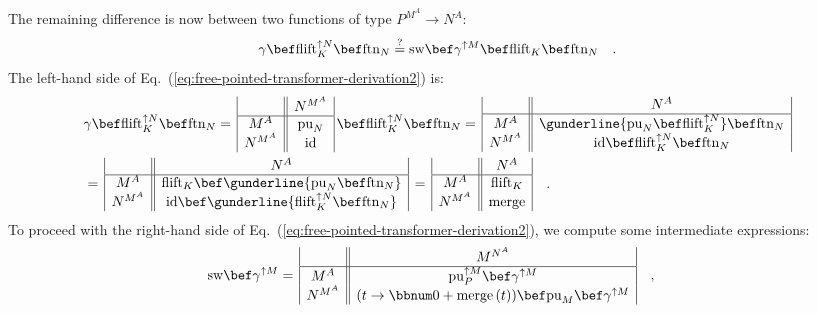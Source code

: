 The remaining difference is now between two functions of type $P^{M^{A}}\rightarrow N^{A}$:
\begin{equation}
\gamma\bef\text{flift}_{K}^{\uparrow N}\bef\text{ftn}_{N}\overset{?}{=}\text{sw}\bef\gamma^{\uparrow M}\bef\text{flift}_{K}\bef\text{ftn}_{N}\quad.\label{eq:free-pointed-transformer-derivation2}
\end{equation}
The left-hand side of Eq.~(\ref{eq:free-pointed-transformer-derivation2})
is:
\begin{align*}
 & \gamma\bef\text{flift}_{K}^{\uparrow N}\bef\text{ftn}_{N}=\,\begin{array}{|c||c|}
 & N^{M^{A}}\\
\hline M^{A} & \text{pu}_{N}\\
N^{M^{A}} & \text{id}
\end{array}\,\bef\text{flift}_{K}^{\uparrow N}\bef\text{ftn}_{N}=\,\begin{array}{|c||c|}
 & N^{A}\\
\hline M^{A} & \gunderline{\text{pu}_{N}\bef\text{flift}_{K}^{\uparrow N}}\bef\text{ftn}_{N}\\
N^{M^{A}} & \text{id}\bef\text{flift}_{K}^{\uparrow N}\bef\text{ftn}_{N}
\end{array}\\
 & =\,\begin{array}{|c||c|}
 & N^{A}\\
\hline M^{A} & \text{flift}_{K}\bef\gunderline{\text{pu}_{N}\bef\text{ftn}_{N}}\\
N^{M^{A}} & \text{id}\bef\gunderline{\text{flift}_{K}^{\uparrow N}\bef\text{ftn}_{N}}
\end{array}\,=\,\begin{array}{|c||c|}
 & N^{A}\\
\hline M^{A} & \text{flift}_{K}\\
N^{M^{A}} & \text{merge}
\end{array}\quad.
\end{align*}
To proceed with the right-hand side of Eq.~(\ref{eq:free-pointed-transformer-derivation2}),
we compute some intermediate expressions:
\begin{align*}
 & \text{sw}\bef\gamma^{\uparrow M}=\,\begin{array}{|c||c|}
 & M^{N^{A}}\\
\hline M^{A} & \text{pu}_{P}^{\uparrow M}\bef\gamma^{\uparrow M}\\
N^{M^{A}} & (t\rightarrow\bbnum 0+\text{merge}\,(t))\bef\text{pu}_{M}\bef\gamma^{\uparrow M}
\end{array}\quad,
\end{align*}
